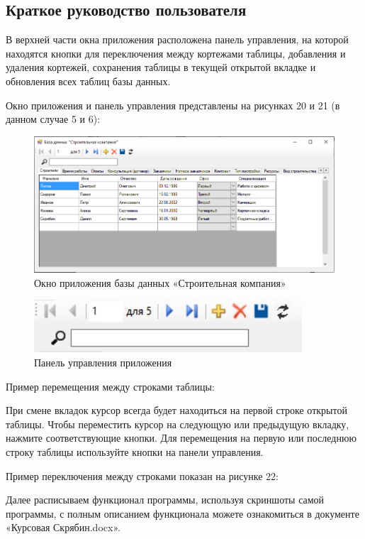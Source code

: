 \documentclass{../SIBGU-state}
\begin{document}
\subsection{Краткое руководство пользователя}
В верхней части окна приложения расположена панель управления, на которой находятся кнопки для переключения между кортежами таблицы, добавления и удаления кортежей, сохранения таблицы в текущей открытой вкладке и обновления всех таблиц базы данных.\par 
Окно приложения и панель управления представлены на рисунках 20 и 21 (в данном случае 5 и 6): \par
\begin{figure}[htb]
	\centering
	\includegraphics[width=.9\textwidth]{ris/ris5.png}
	\parskip=1pt
	\caption{Окно приложения базы данных «Строительная компания»}
	\label{fig:in_appendix}
\end{figure}\par
\begin{figure}[htb]
	\centering
	\includegraphics[width=.5\textwidth]{ris/ris6.jpg}
	\parskip=1pt
	\caption{Панель управления приложения}
	\label{fig:in_appendix}
\end{figure}\par
Пример перемещения между строками таблицы: \par
При смене вкладок курсор всегда будет находиться на первой строке открытой таблицы. Чтобы переместить курсор на следующую или предыдущую вкладку, нажмите соответствующие кнопки. Для перемещения на первую или последнюю строку таблицы используйте кнопки на панели управления.\par\bigskip
Пример переключения между строками показан на рисунке 22:\par
Далее расписываем функционал программы, используя скриншоты самой программы, с полным описанием функционала можете ознакомиться в документе «Курсовая Скрябин.docx». \par
\end{document}
